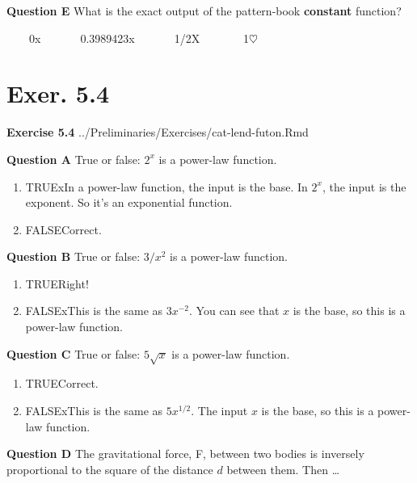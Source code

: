 \documentclass[
  letterpaper,
  DIV=11,
  numbers=noendperiod,
  oneside]{article}
\providecommand{\tightlist}{%
  \setlength{\itemsep}{0pt}\setlength{\parskip}{0pt}}\usepackage{longtable,booktabs,array}
\begin{document}
\begin{multicols}{2}
\textbf{Question E} What is the exact output of the pattern-book
\textbf{constant} function?

~~~~{0{x}}~~~~~~~{0.3989423{x}}~~~~~~~{1/2{︎X
}}~~~~~~~{1{\(\heartsuit\ \)}}

\hypertarget{exer.-5.4}{%
\section*{Exer. 5.4}\label{exer.-5.4}}

\textbf{Exercise 5.4} ../Preliminaries/Exercises/cat-lend-futon.Rmd

\textbf{Question A} True or false: \(2^x\) is a power-law function.

\begin{enumerate}
\def\labelenumi{\roman{enumi}.}
\tightlist
\item
  {TRUE{xIn a power-law function, the input is the base. In \(2^x\),
  the input is the exponent. So it's an exponential function.}}\\
\item
  {FALSE{Correct.~}}
\end{enumerate}

\textbf{Question B} True or false: \(3/x^2\) is a power-law function.

\begin{enumerate}
\def\labelenumi{\roman{enumi}.}
\tightlist
\item
  {TRUE{Right!~}}\\
\item
  {FALSE{xThis is the same as \(3 x^{-2}\). You can see that \(x\) is
  the base, so this is a power-law function.}}
\end{enumerate}

\textbf{Question C} True or false: \(5\sqrt{x}\) is a power-law
function.

\begin{enumerate}
\def\labelenumi{\roman{enumi}.}
\tightlist
\item
  {TRUE{Correct.~}}\\
\item
  {FALSE{xThis is the same as \(5 x^{1/2}\). The input \(x\) is the
  base, so this is a power-law function.}}
\end{enumerate}

\textbf{Question D} The gravitational force, F, between two bodies is
inversely proportional to the square of the distance \(d\) between them.
Then \ldots{}


\end{multicols}
\end{document}
